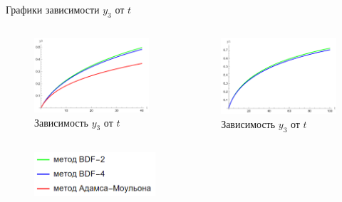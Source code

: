 \documentclass[ignoreonframetext,unicode]{beamer}
\begin{document}
\begin{frame}{Графики зависимости $y_3$ от $t$}
		\begin{columns}
		
		
		\begin{figure}[!htbp]
			\centering
			\includegraphics[width=1\textwidth]{T40-3}%
			\caption{Зависимость $y_3$ от $t$}
			\vspace*{-2mm}
			\label{T40-3}
		\end{figure}
			
		\begin{figure}[!htbp]
			\centering
			\includegraphics[width=1\textwidth]{T100-3}%
			\caption{Зависимость $y_3$ от $t$}
			\vspace*{-2mm}
			\label{T100-3}
		\end{figure}
	\end{columns}

	\begin{figure}[!htbp]
	\centering
	\includegraphics[width=0.4\textwidth]{graph-legend}
	\end{figure}
\end{frame}
\end{document}
